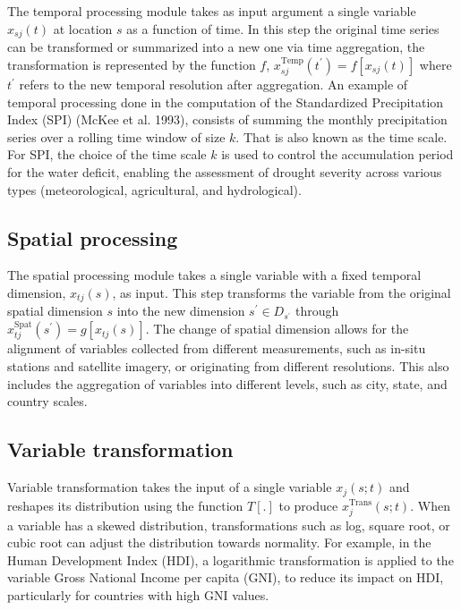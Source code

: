 \documentclass[
]{interact}
\begin{document}
The temporal processing module takes as input argument a single variable
\(x_{sj}(t)\) at location \(s\) as a function of time. In this step the
original time series can be transformed or summarized into a new one via
time aggregation, the transformation is represented by the function
\(f\), \(x^{\text{Temp}}_{sj}(t^\prime) = f[x_{sj}(t)]\) where
\(t^\prime\) refers to the new temporal resolution after aggregation. An
example of temporal processing done in the computation of the
Standardized Precipitation Index (SPI) (McKee et al. 1993), consists of
summing the monthly precipitation series over a rolling time window of
size \(k\). That is also known as the time scale. For SPI, the choice of
the time scale \(k\) is used to control the accumulation period for the
water deficit, enabling the assessment of drought severity across
various types (meteorological, agricultural, and hydrological).

\hypertarget{spatial-processing}{%
\subsection{Spatial processing}\label{spatial-processing}}

The spatial processing module takes a single variable with a fixed
temporal dimension, \(x_{tj}(s)\), as input. This step transforms the
variable from the original spatial dimension \(s\) into the new
dimension \(s^\prime \in D_{s^\prime}\) through
\(x^{\text{Spat}}_{tj}(s^\prime) = g[x_{tj}(s)]\). The change of spatial
dimension allows for the alignment of variables collected from different
measurements, such as in-situ stations and satellite imagery, or
originating from different resolutions. This also includes the
aggregation of variables into different levels, such as city, state, and
country scales.

\hypertarget{variable-transformation}{%
\subsection{Variable transformation}\label{variable-transformation}}

Variable transformation takes the input of a single variable
\(x_j(s;t)\) and reshapes its distribution using the function \(T[.]\)
to produce \(x^{\text{Trans}}_{j}(s;t)\). When a variable has a skewed
distribution, transformations such as log, square root, or cubic root
can adjust the distribution towards normality. For example, in the Human
Development Index (HDI), a logarithmic transformation is applied to the
variable Gross National Income per capita (GNI), to reduce its impact on
HDI, particularly for countries with high GNI values.
\end{document}
